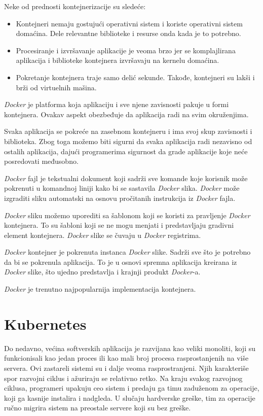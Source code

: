 Neke od prednosti kontejnerizacije su sledeće:
\begin{itemize}
    \item Kontejneri nemaju gostujući operativni sistem i koriste operativni sistem domaćina. 
    Dele relevantne biblioteke i resurse onda kada je to potrebno.
    \item Procesiranje i izvršavanje aplikacije je veoma brzo jer se komplajlirana aplikacija 
    i biblioteke kontejnera izvršavaju na kernelu domaćina.
    \item Pokretanje kontejnera traje samo delić sekunde. Takođe, kontejneri su lakši i brži 
    od virtuelnih mašina.
\end{itemize}

\textit{Docker} je platforma koja aplikaciju i sve njene zavisnosti pakuje u formi kontejnera. 
Ovakav aspekt obezbeđuje da aplikacija radi na svim okruženjima.

Svaka aplikacija se pokreće na zasebnom kontejneru i ima svoj skup zavisnosti i biblioteka. 
Zbog toga možemo biti sigurni da svaka aplikacija radi nezavisno od ostalih aplikacija, 
dajući programerima sigurnost da grade aplikacije koje neće posredovati međusobno.

\textit{Docker} fajl je tekstualni dokument koji sadrži sve komande koje korisnik može pokrenuti 
u komandnoj liniji kako bi se sastavila \textit{Docker} slika. \textit{Docker} može izgraditi sliku automatski 
na osnovu pročitanih instrukcija iz \textit{Docker} fajla.

\textit{Docker} sliku možemo uporediti sa šablonom koji se koristi za pravljenje \textit{Docker} kontejnera. 
To su šabloni koji se ne mogu menjati i predstavljaju gradivni element kontejnera.
\textit{Docker} slike se čuvaju u \textit{Docker} registrima. 

\textit{Docker} kontejner je pokrenuta instanca \textit{Docker} slike. Sadrži sve što je potrebno da bi se 
pokrenula aplikacija. To je u osnovi spremna aplikacija kreirana iz \textit{Docker} slike, 
što ujedno predstavlja i krajnji produkt \textit{Docker}-a.~\cite{docker}

\textit{Docker} je trenutno najpopularnija implementacija kontejnera.

\section{Kubernetes}\label{sec:kubernetes}

Do nedavno, većina softverskih aplikacija je razvijana kao veliki monoliti, koji su funkcionisali kao jedan proces 
ili kao mali broj procesa rasprostanjenih na više servera. Ovi zastareli sistemi su i dalje veoma rasprostranjeni. 
Njih karakteriše spor razvojni ciklus i ažuriraju se relativno retko. Na kraju svakog razvojnog ciklusa, programeri
upakuju ceo sistem i predaju ga timu zaduženom za operacije, koji ga kasnije instalira i nadgleda. U slučaju hardverske
greške, tim za operacije ručno migrira sistem na preostale servere koji su bez greške.

